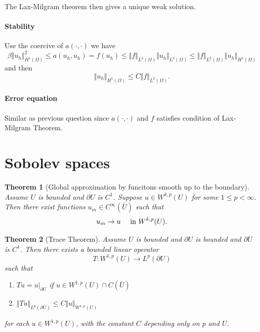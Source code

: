 \documentclass[11pt,letterpaper]{article}
\newtheorem{thm}{Theorem}
\begin{document}
The
Lax-Milgram theorem then gives a unique weak solution.
\paragraph{Stability}
Use the coercive of $a(\cdot, \cdot)$ we have
\begin{displaymath}
  \beta\Vert u_h\Vert_{H^1(\Omega)}^2
  \leq a(u_h,u_h)= f(u_h)
  \leq \Vert f\Vert_{L^2(\Omega)}\Vert u_h\Vert_{L^2(\Omega)}
  \leq \Vert f\Vert_{L^2(\Omega)}\Vert u_h\Vert_{H^1(\Omega)}
\end{displaymath}
and then
\begin{displaymath}
  \Vert u_h\Vert_{H^1(\Omega)}\leq C \Vert f\Vert_{L^2(\Omega)}.
\end{displaymath}

\paragraph{Error equation}
Similar as previous question since $a(\cdot, \cdot)$ and $f$ satisfies condition of Lax-Milgram Theorem.
\section{Sobolev spaces}
\label{sec:sobolev}



\begin{thm}[Global approximation by funcitons smooth up to the boundary]
  \label{thm:approx}
  Assume $U$ is bounded and $\partial U$ is $C^1$.
  Suppose $u\in W^{k,p}(U)$ for some $1\leq p <\infty$.
  Then there exist functions $u_m\in C^\infty(\bar U)$ such that
  \begin{displaymath}
    u_m\rightarrow u\quad \textmd{ in }W^{k,p}(U).
  \end{displaymath}
\end{thm}


\begin{thm}[Trace Theorem]
  \label{thm:trace}
  Assume $U$ is bounded and $\partial U$ is bounded and $\partial U$ is $C^1$.
  Then there exists a bounded linear operator
  \begin{displaymath}
    T: W^{1,p}(U)\rightarrow L^p( \partial U)
  \end{displaymath}
  such that
  \begin{enumerate}
  \item $Tu=u|_{\partial U}$ if $u\in W^{1,p}(U)\cap C(\bar U)$
  \item
   $
      \Vert Tu\Vert _{L^p(\partial U)}\leq C\Vert u\Vert_{W^{1,p}(U)}$
 
  \end{enumerate}
  for each $u\in W^{1,p}(U)$, with the constant $C$ depending only on $p$ and $U$.
\end{thm}
\end{document}
